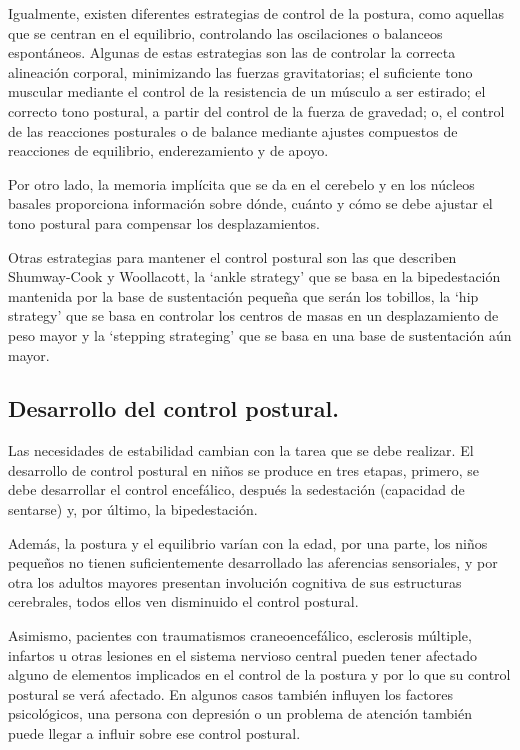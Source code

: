 Igualmente, existen diferentes estrategias de control de la postura, como aquellas que se centran en el equilibrio, controlando las oscilaciones o balanceos espontáneos. Algunas de estas estrategias son las de controlar la correcta alineación corporal, minimizando las fuerzas gravitatorias; el suficiente tono muscular mediante el control de la resistencia de un músculo a ser estirado; el correcto tono postural, a partir del control de la fuerza de gravedad; o, el control de las reacciones posturales o de balance mediante ajustes compuestos de reacciones de equilibrio, enderezamiento y de apoyo. 

Por otro lado, la memoria implícita que se da en el cerebelo y en los núcleos basales proporciona información sobre dónde, cuánto y cómo se debe ajustar el tono postural para compensar los desplazamientos.

Otras estrategias para mantener el control postural son las que describen Shumway-Cook y Woollacott, la ‘ankle strategy’ que se basa en la bipedestación mantenida por la base de sustentación pequeña que serán los tobillos, la ‘hip strategy’ que se basa en controlar los centros de masas en un desplazamiento de peso mayor y la ‘stepping strateging’ que se basa en una base de sustentación aún mayor.

\subsection{Desarrollo del control postural.} 
Las necesidades de estabilidad cambian con la tarea que se debe realizar. El desarrollo de control postural en niños se produce en tres etapas, primero, se debe desarrollar el control encefálico, después la sedestación (capacidad de sentarse) y, por último, la bipedestación.

Además, la postura y el equilibrio varían con la edad, por una parte, los niños pequeños no tienen suficientemente desarrollado las aferencias sensoriales, y por otra los adultos mayores presentan involución cognitiva de sus estructuras cerebrales, todos ellos ven disminuido el control postural.

Asimismo, pacientes con traumatismos craneoencefálico, esclerosis múltiple, infartos u otras lesiones en el sistema nervioso central pueden tener afectado alguno de elementos implicados en el control de la postura y por lo que su control postural se verá afectado. En algunos casos también influyen los factores psicológicos, una persona con depresión o un problema de atención también puede llegar a influir sobre ese control postural.


